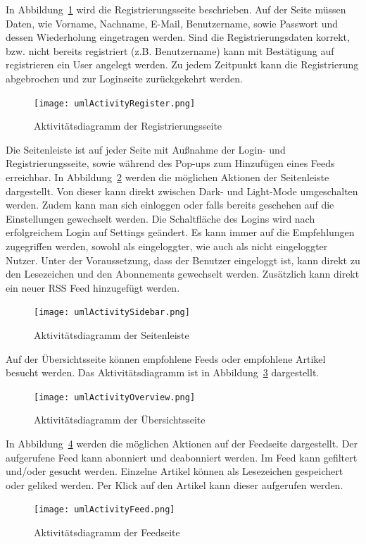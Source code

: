 In Abbildung~\ref{fig:umlActivityRegister.png} wird die Registrierungsseite beschrieben.
Auf der Seite müssen Daten, wie Vorname, Nachname, E-Mail, Benutzername, sowie Passwort und dessen Wiederholung eingetragen werden.
Sind die Registrierungsdaten korrekt, bzw. nicht bereits registriert (z.B. Benutzername) kann mit Bestätigung auf registrieren ein User angelegt werden.
Zu jedem Zeitpunkt kann die Registrierung abgebrochen und zur Loginseite zurückgekehrt werden.
\begin{figure}
    \texttt{[image: umlActivityRegister.png]}
    \caption{Aktivitätsdiagramm der Registrierungsseite}
    \label{fig:umlActivityRegister.png}
\end{figure}

Die Seitenleiste ist auf jeder Seite mit Außnahme der Login- und Registrierungsseite, sowie während des Pop-ups zum Hinzufügen eines Feeds erreichbar.
In Abbildung~\ref{fig:umlActivitySidebar.png} werden die möglichen Aktionen der Seitenleiste dargestellt.
Von dieser kann direkt zwischen Dark- und Light-Mode umgeschalten werden. Zudem kann man sich einloggen
oder falls bereits geschehen auf die Einstellungen gewechselt werden. Die Schaltfläche des Logins wird nach erfolgreichem Login auf Settings geändert.
Es kann immer auf die Empfehlungen zugegriffen werden, sowohl als eingeloggter, wie auch als nicht eingeloggter Nutzer.
Unter der Voraussetzung, dass der Benutzer eingeloggt ist, kann direkt zu den Lesezeichen und den Abonnements gewechselt werden.
Zusätzlich kann direkt ein neuer RSS Feed hinzugefügt werden.
\begin{figure}
    \texttt{[image: umlActivitySidebar.png]}
    \caption{Aktivitätsdiagramm der Seitenleiste}
    \label{fig:umlActivitySidebar.png}
\end{figure}

Auf der Übersichtsseite können empfohlene Feeds oder empfohlene Artikel besucht werden.
Das Aktivitätsdiagramm ist in Abbildung~\ref{fig:umlActivityOverview.png} dargestellt.
\begin{figure}
    \texttt{[image: umlActivityOverview.png]}
    \caption{Aktivitätsdiagramm der Übersichtsseite}
    \label{fig:umlActivityOverview.png}
\end{figure}

In Abbildung~\ref{fig:umlActivityFeed.png} werden die möglichen Aktionen auf der Feedseite dargestellt.
Der aufgerufene Feed kann abonniert und deabonniert werden. Im Feed kann gefiltert und/oder gesucht werden.
Einzelne Artikel können als Lesezeichen gespeichert oder geliked werden. Per Klick auf den Artikel kann dieser aufgerufen werden.
\begin{figure}
    \texttt{[image: umlActivityFeed.png]}
    \caption{Aktivitätsdiagramm der Feedseite}
    \label{fig:umlActivityFeed.png}
\end{figure}

